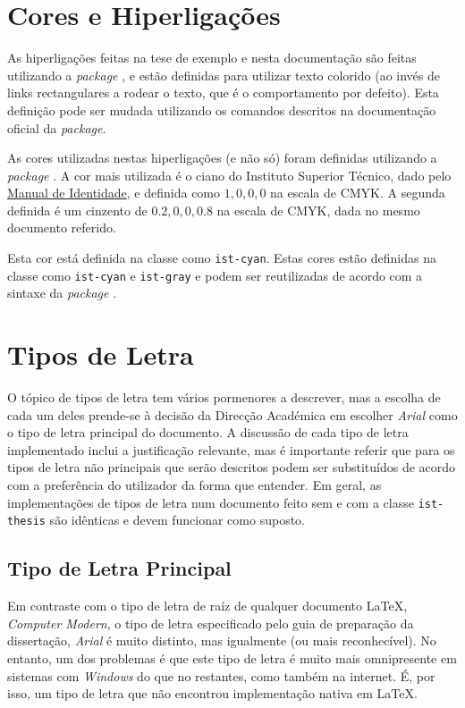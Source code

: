 \documentclass{../ist-thesis}
\begin{document}
\section{Cores e Hiperligações}

As hiperligações feitas na tese de exemplo e nesta documentação são feitas utilizando a \textit{package} , e estão definidas para utilizar texto colorido (ao invés de links rectangulares a rodear o texto, que é o comportamento por defeito). Esta definição pode ser mudada utilizando os comandos descritos na documentação oficial da \textit{package}.

As cores utilizadas nestas hiperligações (e não só) foram definidas utilizando a \textit{package} . A cor mais utilizada é o ciano do Instituto Superior Técnico, dado pelo \href{https://tecnico.ulisboa.pt/pt/sobre-o-tecnico/institucional/logo-e-manual-de-identidade/}{Manual de Identidade}, e definida como $1,0,0,0$ na escala de CMYK. A segunda definida é um cinzento de $0.2,0,0,0.8$ na escala de CMYK, dada no mesmo documento referido.

Esta cor está definida na classe como \texttt{ist-cyan}.
Estas cores estão definidas na classe como \texttt{ist-cyan} e \texttt{ist-gray} e podem ser reutilizadas de acordo com a sintaxe da \textit{package} .

\section{Tipos de Letra}

O tópico de tipos de letra tem vários pormenores a descrever, mas a escolha de cada um deles prende-se à decisão da Direcção Académica em escolher \textit{Arial} como o tipo de letra principal do documento. A discussão de cada tipo de letra implementado inclui a justificação relevante, mas é importante referir que para os tipos de letra não principais que serão descritos podem ser substituídos de acordo com a preferência do utilizador da forma que entender. Em geral, as implementações de tipos de letra num documento feito sem e com a classe \texttt{ist-thesis} são idênticas e devem funcionar como suposto.

\subsection{Tipo de Letra Principal}

Em contraste com o tipo de letra de raíz de qualquer documento \LaTeX{}\footnotemark{}, \textit{Computer Modern}, o tipo de letra especificado pelo guia de preparação da dissertação, \textit{Arial} é muito distinto, mas igualmente (ou mais reconhecível). No entanto, um dos problemas é que este tipo de letra é muito mais omnipresente em sistemas com \textit{Windows} do que no restantes, como também na internet. É, por isso, um tipo de letra que não encontrou implementação nativa em \LaTeX{}.
\end{document}
